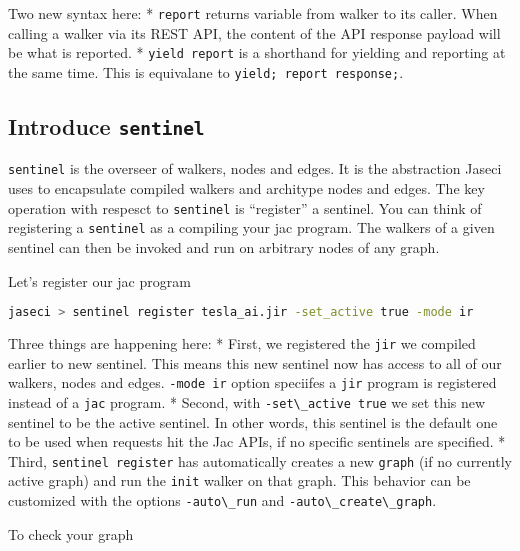 Two new syntax here: * \passthrough{\lstinline!report!} returns variable
from walker to its caller. When calling a walker via its REST API, the
content of the API response payload will be what is reported. *
\passthrough{\lstinline!yield report!} is a shorthand for yielding and
reporting at the same time. This is equivalane to
\passthrough{\lstinline!yield; report response;!}.

\hypertarget{introduce-sentinel}{%
\subsection{\texorpdfstring{Introduce
\texttt{sentinel}}{Introduce sentinel}}\label{introduce-sentinel}}

\passthrough{\lstinline!sentinel!} is the overseer of walkers, nodes and
edges. It is the abstraction Jaseci uses to encapsulate compiled walkers
and architype nodes and edges. The key operation with respesct to
\passthrough{\lstinline!sentinel!} is ``register'' a sentinel. You can
think of registering a \passthrough{\lstinline!sentinel!} as a compiling
your jac program. The walkers of a given sentinel can then be invoked
and run on arbitrary nodes of any graph.

Let's register our jac program

\begin{lstlisting}[language=bash]
jaseci > sentinel register tesla_ai.jir -set_active true -mode ir
\end{lstlisting}

Three things are happening here: * First, we registered the
\passthrough{\lstinline!jir!} we compiled earlier to new sentinel. This
means this new sentinel now has access to all of our walkers, nodes and
edges. \passthrough{\lstinline!-mode ir!} option speciifes a
\passthrough{\lstinline!jir!} program is registered instead of a
\passthrough{\lstinline!jac!} program. * Second, with
\passthrough{\lstinline!-set\_active true!} we set this new sentinel to
be the active sentinel. In other words, this sentinel is the default one
to be used when requests hit the Jac APIs, if no specific sentinels are
specified. * Third, \passthrough{\lstinline!sentinel register!} has
automatically creates a new \passthrough{\lstinline!graph!} (if no
currently active graph) and run the \passthrough{\lstinline!init!}
walker on that graph. This behavior can be customized with the options
\passthrough{\lstinline!-auto\_run!} and
\passthrough{\lstinline!-auto\_create\_graph!}.

To check your graph

